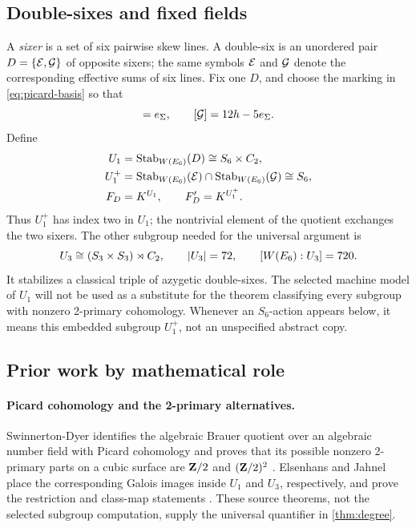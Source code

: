 \subsection{Double-sixes and fixed fields}

A \emph{sixer} is a set of six pairwise skew lines.  A double-six is an
unordered pair \(D=\{\mathcal E,\mathcal G\}\) of opposite sixers; the same symbols
\(\mathcal E\) and \(\mathcal G\) denote the corresponding effective sums of six lines.
Fix one \(D\), and choose the marking in \cref{eq:picard-basis} so that
\begin{equation}
 [\cE]=e_\Sigma,\qquad [\cG]=12h-5e_\Sigma.
\label{eq:marked-double-six}
\end{equation}
Define
\begin{align}
 U_1&=\operatorname{Stab}_{W(E_6)}(D)\cong S_6\times C_2,\\
 U_1^+&=\operatorname{Stab}_{W(E_6)}(\mathcal E)\cap\operatorname{Stab}_{W(E_6)}(\mathcal G)\cong S_6,\\
 F_D&=K^{U_1},\qquad F_D'=K^{U_1^+}.
\label{eq:basic-fields}
\end{align}
Thus \(U_1^+\) has index two in \(U_1\); the nontrivial element of the
quotient exchanges the two sixers.  The other subgroup needed for the
universal argument is
\[
 U_3\cong(S_3\times S_3)\rtimes C_2,\qquad
 |U_3|=72,\qquad [W(E_6):U_3]=720.
\]
It stabilizes a classical triple of azygetic double-sixes.  The selected
machine model of \(U_1\) will not be used as a substitute for the theorem
classifying every subgroup with nonzero 2-primary cohomology.  Whenever an
\(S_6\)-action appears below, it means this embedded subgroup \(U_1^+\), not
an unspecified abstract copy.

\subsection{Prior work by mathematical role}

\paragraph{Picard cohomology and the 2-primary alternatives.}
Swinnerton-Dyer identifies the algebraic Brauer quotient over an algebraic
number field with Picard cohomology and proves that its possible nonzero
2-primary parts on a cubic surface are \(\mathbf Z/2\) and \((\mathbf Z/2)^2\)
\cite{SwinnertonDyer1993}.  Elsenhans and Jahnel place the corresponding
Galois images inside \(U_1\) and \(U_3\), respectively, and prove the
restriction and class-map statements \cite{ElsenhansJahnel2010Brauer}.
These source theorems, not the selected subgroup computation, supply the
universal quantifier in \cref{thm:degree}.

